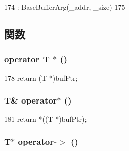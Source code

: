 \begin{DoxyCode}
174         : BaseBufferArg(_addr, _size)
175     { }
\end{DoxyCode}


\subsection{関数}
\hypertarget{classTypedBufferArg_a4e20322854ce5d78776cdaf1a87aacd9}{
\subsubsection[{operator T $\ast$}]{\setlength{\rightskip}{0pt plus 5cm}operator T $\ast$ ()}}
\label{classTypedBufferArg_a4e20322854ce5d78776cdaf1a87aacd9}



\begin{DoxyCode}
178 { return (T *)bufPtr; }
\end{DoxyCode}
\hypertarget{classTypedBufferArg_af7f8c6b921dca2b94f6e7ee14e762770}{
\subsubsection[{operator$\ast$}]{\setlength{\rightskip}{0pt plus 5cm}T\& operator$\ast$ ()}}
\label{classTypedBufferArg_af7f8c6b921dca2b94f6e7ee14e762770}



\begin{DoxyCode}
181 { return *((T *)bufPtr); }
\end{DoxyCode}
\hypertarget{classTypedBufferArg_af6e485beee07fd401de29c8cdf898c69}{
\subsubsection[{operator-\/$>$}]{\setlength{\rightskip}{0pt plus 5cm}T$\ast$ operator-\/$>$ ()}}
\label{classTypedBufferArg_af6e485beee07fd401de29c8cdf898c69}



